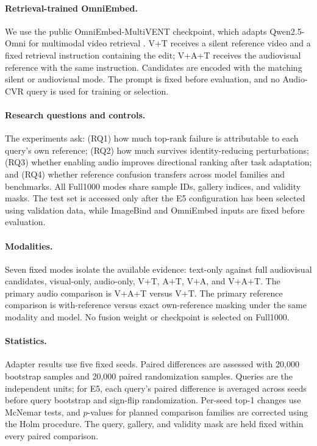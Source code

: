 \documentclass[letterpaper]{article}
\begin{document}
\paragraph{Retrieval-trained OmniEmbed.}
We use the public OmniEmbed-MultiVENT checkpoint, which adapts Qwen2.5-Omni for multimodal video retrieval \cite{xu2025qwen25omni,wu2025omniembed}.
V+T receives a silent reference video and a fixed retrieval instruction containing the edit; V+A+T receives the audiovisual reference with the same instruction.
Candidates are encoded with the matching silent or audiovisual mode.
The prompt is fixed before evaluation, and no Audio-CVR query is used for training or selection.

\paragraph{Research questions and controls.}
The experiments ask: (RQ1) how much top-rank failure is attributable to each query's own reference; (RQ2) how much survives identity-reducing perturbations; (RQ3) whether enabling audio improves directional ranking after task adaptation; and (RQ4) whether reference confusion transfers across model families and benchmarks.
All Full1000 modes share sample IDs, gallery indices, and validity masks.
The test set is accessed only after the E5 configuration has been selected using validation data, while ImageBind and OmniEmbed inputs are fixed before evaluation.

\paragraph{Modalities.}
Seven fixed modes isolate the available evidence: text-only against full audiovisual candidates, visual-only, audio-only, V+T, A+T, V+A, and V+A+T.
The primary audio comparison is V+A+T versus V+T.
The primary reference comparison is with-reference versus exact own-reference masking under the same modality and model.
No fusion weight or checkpoint is selected on Full1000.

\paragraph{Statistics.}
Adapter results use five fixed seeds.
Paired differences are assessed with 20,000 bootstrap samples and 20,000 paired randomization samples.
Queries are the independent units; for E5, each query's paired difference is averaged across seeds before query bootstrap and sign-flip randomization.
Per-seed top-1 changes use McNemar tests, and $p$-values for planned comparison families are corrected using the Holm procedure.
The query, gallery, and validity mask are held fixed within every paired comparison.
\end{document}
